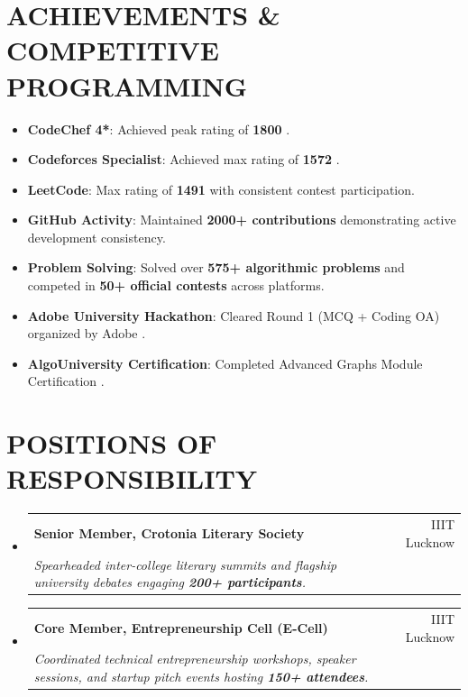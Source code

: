 \documentclass[letterpaper,10.5pt]{article}
\makeatletter
\newcommand{\resumeItem}[1]{
  \item\small{
    {#1 \vspace{-1.5pt}}
  }
}
\newcommand{\resumeSubheading}[4]{
  \vspace{-1.5pt}\item
    \begin{tabular*}{0.99\textwidth}[t]{l@{\extracolsep{\fill}}r}
      \textbf{#1} & #2 \\
      \textit{\small#3} & \textit{\small #4} \\
    \end{tabular*}\vspace{-5pt}
}
\newcommand{\resumeSubHeadingListStart}{\begin{itemize}[leftmargin=0.15in, label={}]}
\newcommand{\resumeSubHeadingListEnd}{\end{itemize}}
\makeatother
\begin{document}
\section{ACHIEVEMENTS \& COMPETITIVE PROGRAMMING}
 \begin{itemize}[leftmargin=0.15in, itemsep=2pt, parsep=0pt, topsep=2pt]
    \resumeItem{\textbf{CodeChef 4*}: Achieved peak rating of \textbf{1800} \href{https://www.codechef.com/users/prashik_24}{\faExternalLinkAlt}.}
    \resumeItem{\textbf{Codeforces Specialist}: Achieved max rating of \textbf{1572} \href{https://codeforces.com/profile/prashik24}{\faExternalLinkAlt}.}
    \resumeItem{\textbf{LeetCode}: Max rating of \textbf{1491} with consistent contest participation.}
    \resumeItem{\textbf{GitHub Activity}: Maintained \textbf{2000+ contributions} demonstrating active development consistency.}
    \resumeItem{\textbf{Problem Solving}: Solved over \textbf{575+ algorithmic problems} and competed in \textbf{50+ official contests} across platforms.}
    \resumeItem{\textbf{Adobe University Hackathon}: Cleared Round 1 (MCQ + Coding OA) organized by Adobe \href{https://github.com/prashik24}{\faExternalLinkAlt}.}
    \resumeItem{\textbf{AlgoUniversity Certification}: Completed Advanced Graphs Module Certification \href{https://github.com/prashik24}{\faExternalLinkAlt}.}
 \end{itemize}

\section{POSITIONS OF RESPONSIBILITY}
  \resumeSubHeadingListStart
    \resumeSubheading
      {Senior Member, Crotonia Literary Society}{IIIT Lucknow}
      {Spearheaded inter-college literary summits and flagship university debates engaging \textbf{200+ participants}.}{}
    \vspace{-4pt}
    \resumeSubheading
      {Core Member, Entrepreneurship Cell (E-Cell)}{IIIT Lucknow}
      {Coordinated technical entrepreneurship workshops, speaker sessions, and startup pitch events hosting \textbf{150+ attendees}.}{}
  \resumeSubHeadingListEnd
\end{document}
